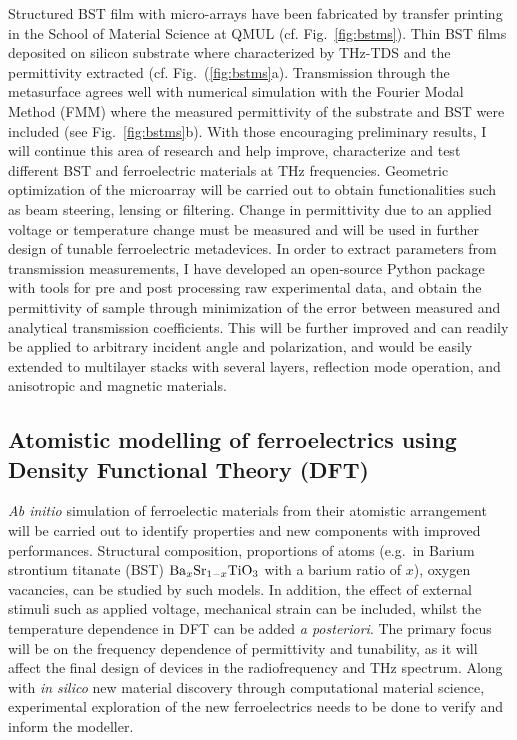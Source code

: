 \documentclass[11pt]{academia}
\begin{document}
Structured BST film with micro-arrays have been fabricated by transfer printing 
in the School of Material Science at QMUL (cf. Fig.~\ref{fig:bstms}). 
Thin BST films deposited on silicon substrate where characterized by 
THz-TDS and the permittivity extracted (cf. Fig.~(\ref{fig:bstms}a). Transmission through the metasurface 
agrees well with numerical simulation with the Fourier Modal Method (FMM) where 
the measured permittivity of the substrate and BST were included (see Fig.~\ref{fig:bstms}b). 
With those encouraging preliminary results, I will continue 
this area of research and help improve, characterize and test different 
BST and ferroelectric materials at THz frequencies. Geometric optimization of the 
microarray will be carried out to obtain functionalities such as beam steering, 
lensing or filtering. Change in permittivity due to an applied voltage or temperature change 
must be measured and will be used in further design of tunable ferroelectric metadevices. 
In order to extract parameters from transmission measurements, I have developed an open-source Python 
package\autocite{tdsxtract} 
with tools for pre and post processing 
raw experimental data, and obtain the permittivity of sample through minimization 
of the error between measured and analytical transmission coefficients. This 
will be further improved and can readily be applied to arbitrary incident 
angle and polarization, and would be easily extended to multilayer stacks with 
several layers, reflection mode operation, and anisotropic and magnetic materials.




\hypertarget{sec:dft}{%
\subsection{Atomistic modelling of ferroelectrics using Density
Functional Theory (DFT)}\label{sec:dft}}

\emph{Ab initio} simulation of ferroelectic materials from their
atomistic arrangement will be carried out to identify properties and new
components with improved performances. Structural
composition, proportions of atoms (e.g.~in Barium strontium titanate
(BST) \({\rm Ba}_{x}{\rm Sr}_{1-x}{\rm TiO}_3\) with a barium ratio of
\(x\)), oxygen vacancies, can be studied by such models. In addition,
the effect of external stimuli such as applied voltage, mechanical
strain can be included, whilst the temperature dependence in DFT can be
added \emph{a posteriori}. The primary focus will be on the frequency
dependence of permittivity and tunability, as it will affect the final
design of devices in the radiofrequency and THz spectrum. Along with \emph{in
silico} new material discovery through computational material science,
experimental exploration of the new ferroelectrics needs to be done to
verify and inform the modeller.
\end{document}
